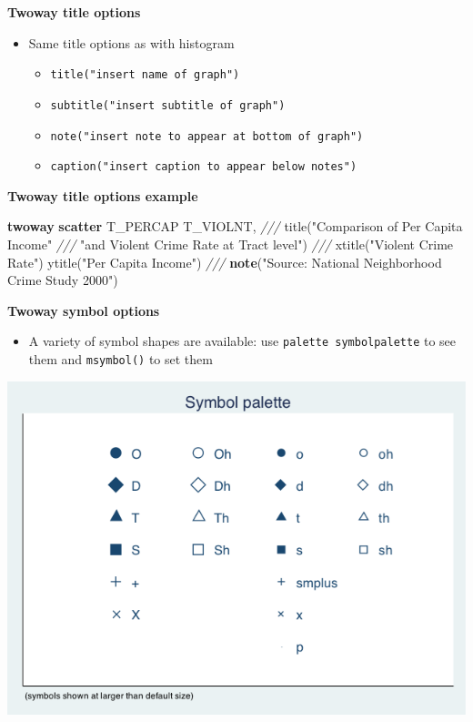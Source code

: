 \documentclass[
]{book}
\newenvironment{Shaded}{\begin{snugshade}}{\end{snugshade}}
\newcommand{\BaseNTok}[1]{\textcolor[rgb]{0.00,0.00,0.81}{#1}}
\newcommand{\CommentTok}[1]{\textcolor[rgb]{0.56,0.35,0.01}{\textit{#1}}}
\newcommand{\KeywordTok}[1]{\textcolor[rgb]{0.13,0.29,0.53}{\textbf{#1}}}
\newcommand{\NormalTok}[1]{#1}
\newcommand{\StringTok}[1]{\textcolor[rgb]{0.31,0.60,0.02}{#1}}
\providecommand{\tightlist}{%
  \setlength{\itemsep}{0pt}\setlength{\parskip}{0pt}}
\begin{document}
\textbf{Twoway title options}

\begin{itemize}
\tightlist
\item
  Same title options as with histogram

  \begin{itemize}
  \tightlist
  \item
    \texttt{title("insert\ name\ of\ graph")}
  \item
    \texttt{subtitle("insert\ subtitle\ of\ graph")}
  \item
    \texttt{note("insert\ note\ to\ appear\ at\ bottom\ of\ graph")}
  \item
    \texttt{caption("insert\ caption\ to\ appear\ below\ notes")}
  \end{itemize}
\end{itemize}

\textbf{Twoway title options example}

\begin{Shaded}
\begin{Highlighting}[]
\KeywordTok{twoway} \KeywordTok{scatter}\NormalTok{ T\_PERCAP T\_VIOLNT, }\CommentTok{///}
    \BaseNTok{title}\NormalTok{(}\StringTok{"Comparison of Per Capita Income"} \CommentTok{///}
          \StringTok{"and Violent Crime Rate at Tract level"}\NormalTok{) }\CommentTok{///}
    \BaseNTok{xtitle}\NormalTok{(}\StringTok{"Violent Crime Rate"}\NormalTok{) }\BaseNTok{ytitle}\NormalTok{(}\StringTok{"Per Capita Income"}\NormalTok{) }\CommentTok{///}
    \KeywordTok{note}\NormalTok{(}\StringTok{"Source: National Neighborhood Crime Study 2000"}\NormalTok{)}
\end{Highlighting}
\end{Shaded}

\textbf{Twoway symbol options}

\begin{itemize}
\tightlist
\item
  A variety of symbol shapes are available: use \texttt{palette\ symbolpalette} to see them and \texttt{msymbol()} to set them
\end{itemize}

\includegraphics{Stata/StataGraph/images/Symbol.png}
\end{document}

